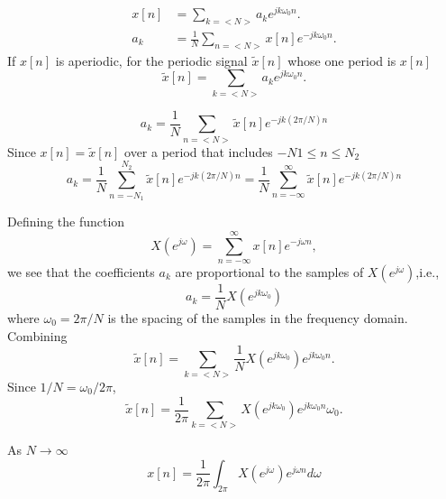 \begin{frame}
    \begin{align*}
        x[n] &= \sum_{k=<N>} a_k e^{jk\omega_0 n}.\\
        a_k &= \frac{1}{N}\sum_{n=<N>} x[n]e^{-jk\omega_0 n}.
    \end{align*}
    If $x[n]$ is aperiodic, for the periodic signal $\tilde{x}[n]$ whose one period is $x[n]$
    \begin{equation*}
        \tilde{x}[n] = \sum_{k=<N>}  a_ke^{jk\omega_0 n}.
    \end{equation*}

    \begin{equation*}
        a_k = \frac{1}{N} \sum_{n=<N>}\tilde{x}[n]e^{-jk(2\pi/N) n}
    \end{equation*}
    Since $x[n] = \tilde{x}[n]$ over a period that includes $-N1\leq n\leq N_2$
    \begin{equation*}
        a_k = \frac{1}{N} \sum_{n=-N_1}^{N_2}\tilde{x}[n]e^{-jk(2\pi/N) n} = \frac{1}{N} \sum_{n=-\infty}^{\infty}\tilde{x}[n]e^{-jk(2\pi/N) n}
    \end{equation*}
\end{frame}

\begin{frame}
    Defining the function
    \begin{equation*}
        X(e^{j\omega}) = \sum_{n=-\infty}^{\infty}x[n]e^{-j\omega n},
    \end{equation*}
    we see that the coefficients $a_k$ are proportional to the samples of $X(e^{j\omega})$,i.e.,
    \begin{equation*}
        a_k = \frac{1}{N} X(e^{jk\omega_0})
    \end{equation*}
    where $\omega_0 = 2\pi/N$ is the spacing of the samples in the frequency domain. Combining
    \begin{equation*}
        \tilde{x}[n] = \sum_{k=<N>}   \frac{1}{N} X(e^{jk\omega_0}) e^{jk\omega_0 n}.
    \end{equation*}
    Since $1/N = \omega_0/2\pi$,
    \begin{equation*}
        \tilde{x}[n] = \frac{1}{2\pi}\sum_{k=<N>}    X(e^{jk\omega_0}) e^{jk\omega_0 n}\omega_0.
    \end{equation*}

    As $N\longrightarrow \infty$
    \begin{equation*}
      x[n] = \frac{1}{2\pi}\int_{2\pi} X(e^{j\omega}) e^{j\omega n}d\omega
    \end{equation*}
\end{frame}

